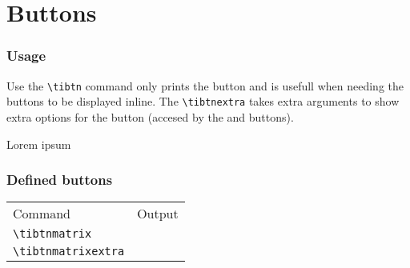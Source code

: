 \documentclass[a4paper,12pt]{article}
\newcommand{\printcmd}[1]{\texttt{\textbackslash #1}}
\begin{document}
\part{Buttons}
\section{Usage}

Use the \printcmd{tibtn} command only prints the button and is usefull when
needing the buttons to be displayed inline. The \printcmd{tibtnextra} takes
extra arguments to show extra options for the button (accesed by the
\tibtnsecond{} and \tibtnalpha{} buttons).

\begin{SideBySideExample}[xrightmargin=5.5cm]

Lorem
ipsum
\end{SideBySideExample}

\section{Defined buttons}

\begin{center}
	\begin{tabular}{|>{\ttfamily}l|l|}
		\multicolumn{2}{c}{\textbf{Defined buttons}}      \\ \hline
		\textnormal{Command}        & Output              \\ \hline
		\printcmd{tibtnmatrix}      & \tibtnmatrix{}      \\ \hline
		\printcmd{tibtnmatrixextra} & \tibtnmatrixextra{} \\ \hline
	\end{tabular}
\end{center}
\end{document}
